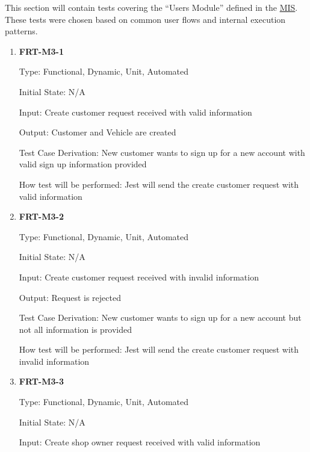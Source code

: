 \documentclass[12pt, titlepage]{article}
\begin{document}

This section will contain tests covering the ``Users Module'' defined in the
\href{https://github.com/arkinmodi/project-sayyara/blob/main/docs/Design/MIS/MIS.pdf}{MIS}. These
tests were chosen based on common user flows and internal execution patterns.

\begin{enumerate}

	\item \textbf{FRT-M3-1}

	      Type: Functional, Dynamic, Unit, Automated

	      Initial State: N/A

	      Input: Create customer request received with valid information

	      Output: Customer and Vehicle are created

	      Test Case Derivation: New customer wants to sign up for a new account with valid sign up
	      information provided

	      How test will be performed: Jest will send the create customer request with valid information

	\item \textbf{FRT-M3-2}

	      Type: Functional, Dynamic, Unit, Automated

	      Initial State: N/A

	      Input: Create customer request received with invalid information

	      Output: Request is rejected

	      Test Case Derivation: New customer wants to sign up for a new account but not all information is
	      provided

	      How test will be performed: Jest will send the create customer request with invalid information

	\item \textbf{FRT-M3-3}

	      Type: Functional, Dynamic, Unit, Automated

	      Initial State: N/A

	      Input: Create shop owner request received with valid information


\end{enumerate}
\end{document}
